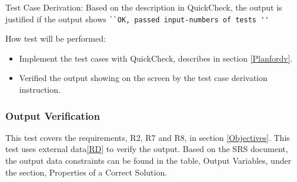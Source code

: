 \documentclass[12pt, titlepage]{article}
\begin{document}
\begin{enumerate}

Test Case Derivation: Based on the description in QuickCheck\cite{QuickCheck},
the output is justified if the output shows \verb|``OK, passed input-numbers of tests ''|


How test will be performed:
 \begin{itemize} 
\item Implement the test cases with QuickCheck\cite{QuickCheck}, describes in 
section \ref{Planfordv}.
\item Verified the output showing on the screen by the test case derivation
instruction.
\end{itemize} 
\end{enumerate}

\subsubsection{Output Verification}\label{STD_VO} 

This test covers the requirements, R2, R7 and R8, in section \ref{Objectives}. This
test
uses external data\ref{RD} to verify the output. Based on the SRS 
document\cite{YS2019}, the output data constraints can be found in the
table, Output Variables, under the section, Properties of a Correct Solution. 
\end{document}
